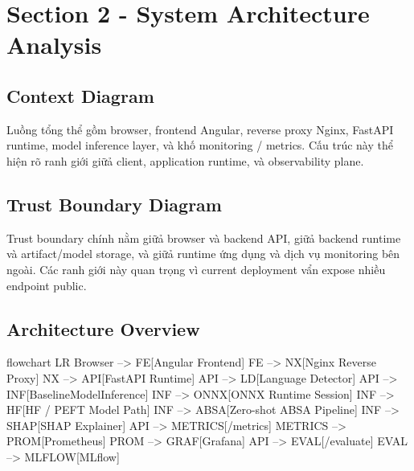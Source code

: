 \section{Section 2 - System Architecture Analysis}
\subsection{Context Diagram}
Luồng tổng thể gồm browser, frontend Angular, reverse proxy Nginx, FastAPI runtime, model inference layer, và khố monitoring / metrics. Cấu trúc này thể hiện rõ ranh giới giữả client, application runtime, và observability plane.

\subsection{Trust Boundary Diagram}
Trust boundary chính nằm giữả browser và backend API, giữả backend runtime và artifact/model storage, và giữả runtime ứng dụng và dịch vụ monitoring bên ngoài. Các ranh giới này quan trọng vì current deployment vẩn expose nhiều endpoint public.

\subsection{Architecture Overview}
\begin{mermaidblock}
flowchart LR
  Browser --> FE[Angular Frontend]
  FE --> NX[Nginx Reverse Proxy]
  NX --> API[FastAPI Runtime]
  API --> LD[Language Detector]
  API --> INF[BaselineModelInference]
  INF --> ONNX[ONNX Runtime Session]
  INF --> HF[HF / PEFT Model Path]
  INF --> ABSA[Zero-shot ABSA Pipeline]
  INF --> SHAP[SHAP Explainer]
  API --> METRICS[/metrics]
  METRICS --> PROM[Prometheus]
  PROM --> GRAF[Grafana]
  API --> EVAL[/evaluate]
  EVAL --> MLFLOW[MLflow]
\end{mermaidblock}

